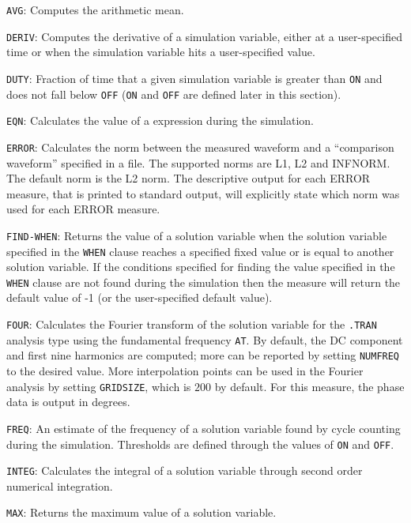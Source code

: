\begin{XyceItemize}
\item \texttt{AVG}: Computes the arithmetic mean.
\item \texttt{DERIV}: Computes the derivative of a simulation variable, either at a user-specified
    time or when the simulation variable hits a user-specified value.
\item \texttt{DUTY}: Fraction of time that a given simulation variable is greater than \texttt{ON} and 
    does not fall below \texttt{OFF} (\texttt{ON} and \texttt{OFF} are defined later in this section).
 \item \texttt{EQN}: Calculates the value of a \Xyce{} expression during the simulation. 
 \item \texttt{ERROR}: Calculates the norm between the measured waveform and a ``comparison
    waveform'' specified in a file.  The supported norms are L1, L2 and INFNORM.  The
    default norm is the L2 norm.  The descriptive output for each ERROR measure,
    that is printed to standard output, will explicitly state which norm  was used for 
    each ERROR measure.
 \item \texttt{FIND-WHEN}: Returns the value of a solution variable when the solution variable specified 
    in the \texttt{WHEN} clause reaches a specified fixed value or is equal to another solution variable.  
    If the conditions specified for finding the value specified in the \texttt{WHEN} clause are not found 
    during the simulation then the measure will return the default value of -1 (or the user-specified 
    default value).
  \item \texttt{FOUR}: Calculates the Fourier transform of the solution variable for the \texttt{.TRAN}
    analysis type using the fundamental frequency \texttt{AT}.  By default, the DC component 
    and first nine harmonics are computed; more can be reported by setting \texttt{NUMFREQ} to the
    desired value.  More interpolation points can be used in the Fourier analysis by setting \texttt{GRIDSIZE},
    which is $200$ by default.  For this measure, the phase data is output in degrees.
  \item \texttt{FREQ}: An estimate of the frequency of a solution variable found by cycle counting
    during the simulation.  Thresholds are defined through the values of \texttt{ON} 
    and \texttt{OFF}.
  \item \texttt{INTEG}: Calculates the integral of a solution variable through second order numerical 
    integration.
  \item \texttt{MAX}: Returns the maximum value of a solution variable.

\end{XyceItemize}
